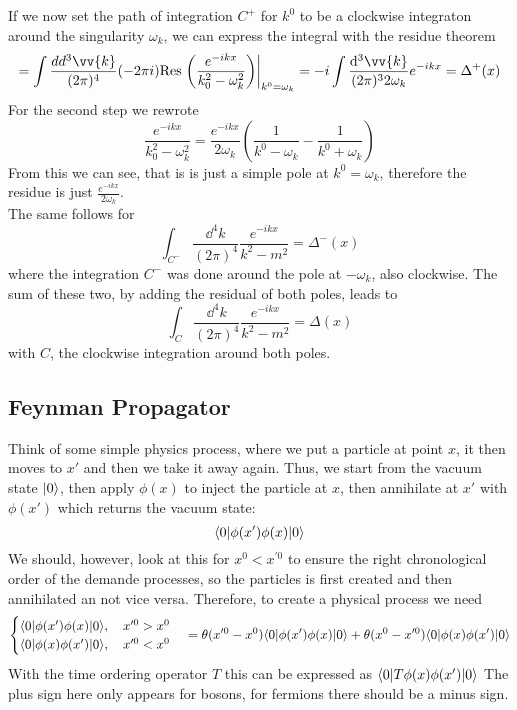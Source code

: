 If we now set the path of integration $C^+$ for $k^0$ to be a clockwise integraton around the singularity $\omega_k$, we can express the integral with the residue theorem
\[ = \int \frac{dd^3 \vv{k}}{(2\pi)^4} (-2\pi i) {\rm Res}\left.\left( \frac{e^{-ikx}}{k_0^2-\omega_k^2}\right)\right|_{k^0 = \omega_k} = -i \int \frac{\dd^3 \vv{k}}{(2\pi)^32\omega_k} e^{-ikx} = \Delta^+(x)\]
For the second step we rewrote 
\[\frac{e^{-ikx}}{k_0^2-\omega_k^2} = \frac{e^{-ikx}}{2\omega_k}\left( \frac{1}{k^0-\omega_k}-\frac{1}{k^0+\omega_k}\right)\]
From this we can see, that is is just a simple pole at $k^0 = \omega_k$, therefore the residue is just $\frac{e^{-ikx}}{2\omega_k}$.\\
The same follows for 
\[ \int_{C^-}\frac{\dd^4 k}{(2\pi)^4}\frac{e^{-ikx}}{k^2-m^2} = \Delta^-(x)\]
where the integration $C^-$ was done around the pole at $-\omega_k$, also clockwise.
The sum of these two, by adding the residual of both poles, leads to
\[ \int_C \frac{\dd^4k}{(2\pi)^4} \frac{e^{-ikx}}{k^2-m^2} = \Delta(x)\]
with $C$, the clockwise integration around both poles.

\subsection{Feynman Propagator}
Think of some simple physics process, where we put a particle at point $x$, it then moves to $x'$ and then we take it away again.
Thus, we start from the vacuum state $|0\rangle$, then apply $\phi(x)$ to inject the particle at $x$, then annihilate at $x'$ with $\phi(x')$ which returns the vacuum state:
\[\langle 0 | \phi(x') \phi(x) | 0\rangle\]
We should, however, look at this for $x^0 < x^{\prime 0}$ to ensure the right chronological order of the demande processes, so the particles is first created and then annihilated an not vice versa. Therefore, to create a physical process we need
\[ \begin{cases} \langle 0 | \phi(x') \phi(x) | 0 \rangle, ~~~x^{\prime 0} > x^0\\
\langle 0|\phi(x) \phi(x') | 0 \rangle, ~~~ x^{\prime 0} < x^0 
\end{cases} = \theta(x^{\prime 0} -x^0) \langle 0 | \phi(x') \phi(x) | 0 \rangle + \theta(x^0 - x^{\prime 0}) \langle 0 | \phi(x) \phi(x') | 0 \rangle\]
With the time ordering operator $T$ this can be expressed as $\langle 0 | T\phi(x) \phi(x') | 0 \rangle$
The plus sign here only appears for bosons, for fermions there should be a minus sign.

